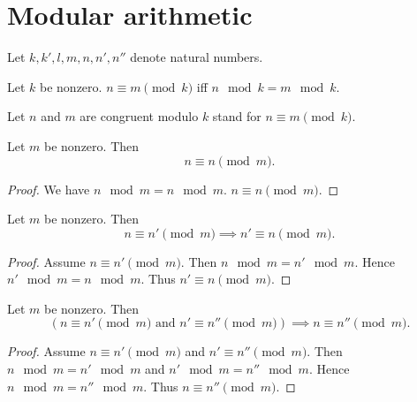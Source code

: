 \documentclass[../../natural-numbers.ftl.tex]{subfiles}
\begin{document}
  \section{Modular arithmetic}

  \begin{forthel}
  \end{forthel}

  \begin{forthel}
    Let $k, k', l, m, n, n', n''$ denote natural numbers.
  \end{forthel}


  \begin{forthel}
    \begin{definition}
      Let $k$ be nonzero.
      $n \equiv m \pmod{k}$ iff $n \mod k = m \mod k$.
    \end{definition}

    Let $n$ and $m$ are congruent modulo $k$ stand for $n \equiv m \pmod{k}$.

    \begin{proposition}[NN 03 03 188421]
      Let $m$ be nonzero.
      Then \[ n \equiv n \pmod{m}. \]
    \end{proposition}
    \begin{proof}
      We have $n \mod m = n \mod m$.
      $n \equiv n \pmod{m}$.
    \end{proof}

    \begin{proposition}[NN 03 03 880545]
      Let $m$ be nonzero.
      Then \[ n \equiv n' \pmod{m} \implies n' \equiv n \pmod{m}. \]
    \end{proposition}
    \begin{proof}
      Assume $n \equiv n' \pmod{m}$.
      Then $n \mod m = n' \mod m$.
      Hence $n' \mod m = n \mod m$.
      Thus $n' \equiv n \pmod{m}$.
    \end{proof}

    \begin{proposition}[NN 03 03 310316]
      Let $m$ be nonzero.
      Then \[ (\text{$n \equiv n' \pmod{m}$ and $n' \equiv n'' \pmod{m}$}) \implies n \equiv n'' \pmod{m}. \]
    \end{proposition}
    \begin{proof}
      Assume $n \equiv n' \pmod{m}$ and $n' \equiv n'' \pmod{m}$.
      Then $n \mod m = n' \mod m$ and $n' \mod m = n'' \mod m$.
      Hence $n \mod m = n'' \mod m$.
      Thus $n \equiv n'' \pmod{m}$.
    \end{proof}


\end{forthel}
\end{document}
